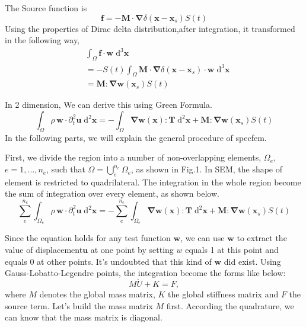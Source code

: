 \documentclass{book}
\begin{document}
The Source function is 
\begin{equation}
 \boldsymbol{f} = -\boldsymbol{M}\cdot\boldsymbol\nabla\delta(\boldsymbol x-\boldsymbol x_s)S(t)
\end{equation}
Using the properties of Dirac delta distribution,after integration, it transformed in the following way,
\begin{equation}
\begin{aligned}
 &\int_\Omega \boldsymbol f\cdot \boldsymbol w\;\mathrm{d}^3\boldsymbol x\\
 &= -S(t)\int_\Omega\boldsymbol{M}\cdot \boldsymbol\nabla\delta(\boldsymbol x-\boldsymbol x_s)\cdot \boldsymbol w\;\mathrm{d}^3\boldsymbol x\\
 &= \boldsymbol{M}:\boldsymbol{\nabla w}(\boldsymbol x_s)S (t)
\end{aligned}
\end{equation}

In 2 dimension, We can derive this using Green Formula. 
\begin{equation}
 \int_\Omega \rho\,\boldsymbol w\cdot \partial_t^2\boldsymbol u\;\mathrm{d}^2\boldsymbol x = -\int_\Omega \boldsymbol{\nabla}\boldsymbol w(\boldsymbol x): \boldsymbol T\;\mathrm{d}^2\boldsymbol x + \boldsymbol{M}:\boldsymbol{\nabla w}(\boldsymbol x_s)S (t)
\end{equation}
In the following parts, we will explain the general procedure of specfem.

First, we divide the region into  a number of non-overlapping elements, $\Omega_e$, $e=1, \ldots, n_e$, such that $\Omega=\bigcup_e^{n_e}\Omega_e$, as shown in Fig.1. In SEM, the shape of element is restricted to quadrilateral. The integration in the whole region become the sum of integration over every element, as shown below.
\begin{equation}
 \sum_e^{n_e}\int_{\Omega_e}  \rho\,\boldsymbol w\cdot \partial_t^2\boldsymbol u\;\mathrm{d}^2\boldsymbol x = -\sum_e^{n_e}\int_{\Omega_e} \boldsymbol{\nabla}\boldsymbol w(\boldsymbol x): \boldsymbol T\;\mathrm{d}^2\boldsymbol x + \boldsymbol{M}:\boldsymbol{\nabla w}(\boldsymbol x_s)S (t)
\end{equation}

Since the equation holds for any test function $\boldsymbol w$, we can use $\boldsymbol w$ to extract the value of displacement$\boldsymbol u$ at one point by setting $w$ equals 1 at this point and equals 0 at other points. It's undoubted that this kind of $\boldsymbol w$ did exist. Using Gauss-Lobatto-Legendre points, the integration become the forms like below:
\begin{equation}
 M\ddot U+K = F,
\end{equation}
where $M$ denotes the global mass matrix, $K$ the global stiffness matrix and $F$ the source term.
Let's build the mass matrix $M$ first. According the quadrature, we can know that the mass matrix is diagonal. 











  
\end{document}

